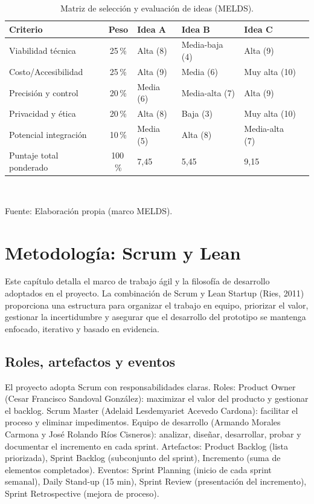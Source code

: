 \documentclass[11pt,a4paper]{article}
\renewcommand{\arraystretch}{1.35}
\begin{document}
\begin{table}[htbp]
\caption{Matriz de selección y evaluación de ideas (MELDS).}
\label{tab:melds}
\small
\centering
\renewcommand{\arraystretch}{1.5}
\begin{tabular}{@{}p{3cm}c p{2.5cm} p{2.5cm} p{2.5cm} c@{}}
\toprule
Criterio & Peso & Idea A & Idea B & Idea C & \\
\midrule
Viabilidad técnica & 25\,\% & Alta (8) & Media-baja (4) & Alta (9) & \\
Costo/Accesibilidad & 25\,\% & Alta (9) & Media (6) & Muy alta (10) & \\
Precisión y control & 20\,\% & Media (6) & Media-alta (7) & Alta (9) & \\
Privacidad y ética & 20\,\% & Alta (8) & Baja (3) & Muy alta (10) & \\
Potencial integración & 10\,\% & Media (5) & Alta (8) & Media-alta (7) & \\
\midrule
Puntaje total ponderado & 100\,\% & 7,45 & 5,45 & 9,15 & \\
\bottomrule
\end{tabular}\\
\renewcommand{\arraystretch}{1.35}
\vspace{4pt}
\raggedright\footnotesize Fuente: Elaboración propia (marco MELDS).
\end{table}
\vspace{0.6em}

\clearpage
{}
\section{Metodología: Scrum y Lean}

Este capítulo detalla el marco de trabajo ágil y la filosofía de desarrollo adoptados en el proyecto. La combinación de Scrum y Lean Startup (Ries, 2011) proporciona una estructura para organizar el trabajo en equipo, priorizar el valor, gestionar la incertidumbre y asegurar que el desarrollo del prototipo se mantenga enfocado, iterativo y basado en evidencia.

\subsection{Roles, artefactos y eventos}
El proyecto adopta Scrum con responsabilidades claras. Roles: Product Owner (Cesar Francisco Sandoval González): maximizar el valor del producto y gestionar el backlog. Scrum Master (Adelaid Lesdemyariet Acevedo Cardona): facilitar el proceso y eliminar impedimentos. Equipo de desarrollo (Armando Morales Carmona y José Rolando Ríos Cisneros): analizar, diseñar, desarrollar, probar y documentar el incremento en cada sprint. Artefactos: Product Backlog (lista priorizada), Sprint Backlog (subconjunto del sprint), Incremento (suma de elementos completados). Eventos: Sprint Planning (inicio de cada sprint semanal), Daily Stand-up (15 min), Sprint Review (presentación del incremento), Sprint Retrospective (mejora de proceso).
\end{document}
